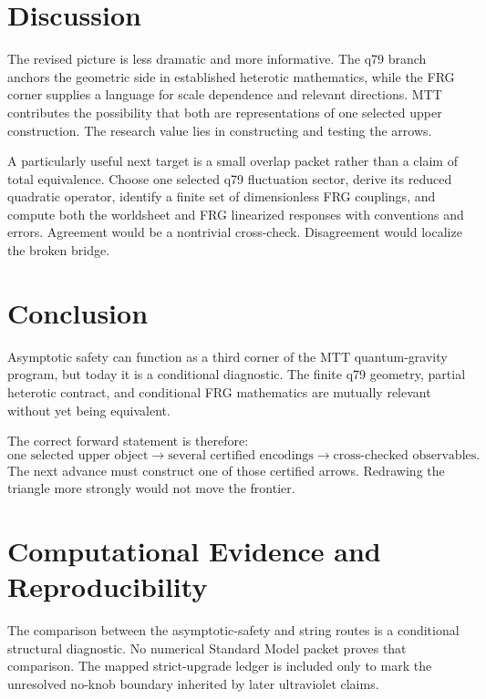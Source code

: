 \documentclass[11pt]{article}
\begin{document}
\section{Discussion}

The revised picture is less dramatic and more informative. The q79 branch
anchors the geometric side in established heterotic mathematics, while the
FRG corner supplies a language for scale dependence and relevant
directions. MTT contributes the possibility that both are representations of
one selected upper construction. The research value lies in constructing and
testing the arrows.

A particularly useful next target is a small overlap packet rather than a
claim of total equivalence. Choose one selected q79 fluctuation sector,
derive its reduced quadratic operator, identify a finite set of
dimensionless FRG couplings, and compute both the worldsheet and FRG
linearized responses with conventions and errors. Agreement would be a
nontrivial cross-check. Disagreement would localize the broken bridge.

\section{Conclusion}

Asymptotic safety can function as a third corner of the MTT quantum-gravity
program, but today it is a conditional diagnostic. The finite q79 geometry,
partial heterotic contract, and conditional FRG mathematics are mutually
relevant without yet being equivalent.

The correct forward statement is therefore:
\[
\text{one selected upper object}
\longrightarrow
\text{several certified encodings}
\longrightarrow
\text{cross-checked observables}.
\]
The next advance must construct one of those certified arrows. Redrawing the
triangle more strongly would not move the frontier.

\section*{Computational Evidence and Reproducibility}
The comparison between the asymptotic-safety and string routes is a conditional structural diagnostic. No numerical Standard Model packet proves that comparison. The mapped strict-upgrade ledger is included only to mark the unresolved no-knob boundary inherited by later ultraviolet claims.
\end{document}
